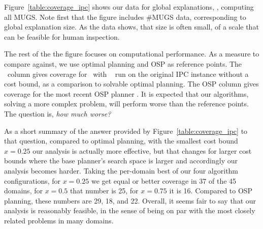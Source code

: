 Figure~\ref{table:coverage_ipc} shows our data for global
explanations, \ie, computing all MUGS.
%
Note first that the figure includes \#MUGS data, corresponding to
global explanation size. As the data shows, that size is often small,
of a scale that can be feasible for human inspection.
%
%
%
%

The rest of the the figure focuses on computational performance. As a
measure to compare against, we use optimal planning and OSP as
reference points. The \hlmcut\ column gives coverage for \astar\
with \hlmcut\ \cite{helmert:domshlak:icaps-09} run on the original IPC
instance without a cost bound, as a comparison to solvable optimal
planning. The OSP column gives coverage for the most recent OSP
planner \cite{katz:etal:icaps-19}.
%
It is expected that our algorithms, solving a more complex problem,
will perform worse than the reference points. The question
is, \emph{how much worse?}

As a short summary of the answer provided by
Figure~\ref{table:coverage_ipc} to that question, compared to optimal
planning, with the smallest cost bound $x=0.25$ our analysis is
actually more effective, but that changes for larger cost bounds where
the base planner's search space is larger and accordingly our analysis
becomes harder. Taking the per-domain best of our four algorithm
configurations, for $x=0.25$ we get equal or better coverage in 37 of
the 45 domains, for $x=0.5$ that number is 25, for $x=0.75$ it is
16. Compared to OSP planning, these numbers are 29, 18, and
22. Overall, it seems fair to say that our analysis is reasonably
feasible, in the sense of being on par with the most closely related
problems in many domains.

